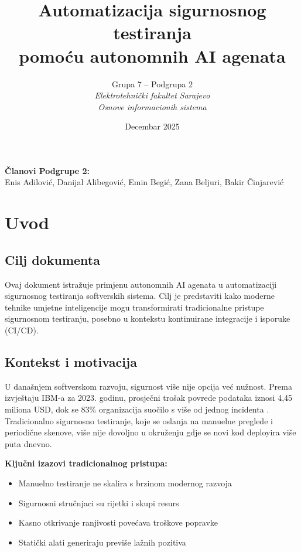 \documentclass[12pt,a4paper]{article}
\title{\textbf{Automatizacija sigurnosnog testiranja\\pomoću autonomnih AI agenata}}
\author{
Grupa 7 -- Podgrupa 2\\[1em]
\textit{Elektrotehnički fakultet Sarajevo}\\
\textit{Osnove informacionih sistema}
}
\date{Decembar 2025}
\begin{document}
\maketitle

\vspace{1cm}
\begin{center}
\textbf{Članovi Podgrupe 2:}\\[0.5em]
Enis Adilović, Danijal Alibegović, Emin Begić, Zana Beljuri, Bakir Činjarević
\end{center}

\newpage
\tableofcontents
\newpage

\section{Uvod}

\subsection{Cilj dokumenta}

Ovaj dokument istražuje primjenu autonomnih AI agenata u automatizaciji sigurnosnog testiranja softverskih sistema. Cilj je predstaviti kako moderne tehnike umjetne inteligencije mogu transformirati tradicionalne pristupe sigurnosnom testiranju, posebno u kontekstu kontinuirane integracije i isporuke (CI/CD).

\subsection{Kontekst i motivacija}

U današnjem softverskom razvoju, sigurnost više nije opcija već nužnost. Prema izvještaju IBM-a za 2023. godinu, prosječni trošak povrede podataka iznosi 4,45 miliona USD, dok se 83\% organizacija suočilo s više od jednog incidenta \cite{ibm2023}. Tradicionalno sigurnosno testiranje, koje se oslanja na manuelne preglede i periodične skenove, više nije dovoljno u okruženju gdje se novi kod deployira više puta dnevno.

\textbf{Ključni izazovi tradicionalnog pristupa:}
\begin{itemize}
    \item Manuelno testiranje ne skalira s brzinom modernog razvoja
    \item Sigurnosni stručnjaci su rijetki i skupi resurs
    \item Kasno otkrivanje ranjivosti povećava troškove popravke
    \item Statički alati generiraju previše lažnih pozitiva
\end{itemize}
\end{document}
